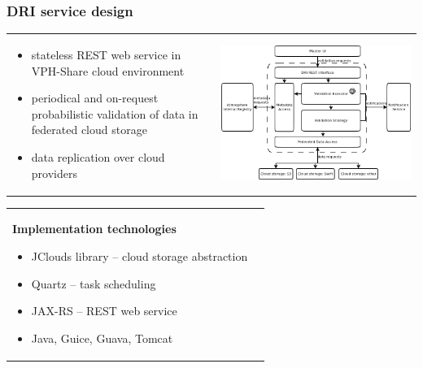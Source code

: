 \documentclass[9pt]{beamer}
\begin{document}

\begin{frame}
\frametitle{\hspace{5mm} \textbf{DRI service design}}
\begin{tabular}{l l}
	\begin{minipage}{0.35\textwidth}
	\begin{itemize}
		\item stateless REST web service in VPH-Share cloud environment
		\item periodical and on-request probabilistic validation of data in federated cloud storage
		\item data replication over cloud providers
	\end{itemize}
	\end{minipage}
	&
	\begin{minipage}{0.6\textwidth}
		\includegraphics[width=0.6\paperwidth]{img/dri-architecture.png}
	\end{minipage}
\end{tabular}
\begin{tabular}{l l}
	\begin{minipage}{0.4\textwidth}
	\textbf{Implementation technologies}
	\begin{itemize}
		\item JClouds library -- cloud storage abstraction
		\item Quartz -- task scheduling
		\item JAX-RS -- REST web service
		\item Java, Guice, Guava, Tomcat
	\end{itemize}

\end{minipage}
\end{tabular}
\end{frame}
\end{document}

